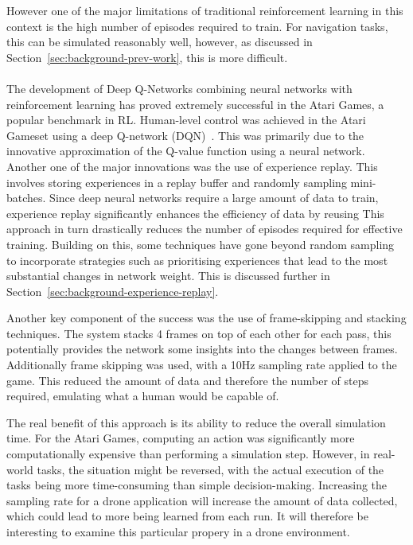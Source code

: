However one of the major limitations of traditional reinforcement learning in this context is the high number of episodes required to train.
For navigation tasks, this can be simulated reasonably well, however, as discussed in Section~\ref{sec:background-prev-work}, this is more difficult. \\\\

The development of Deep Q-Networks combining neural networks with reinforcement learning has proved extremely successful in the Atari Games, a popular benchmark in RL.
Human-level control was achieved in the Atari Gameset using a deep Q-network (DQN)~\cite{humanLevelControlDQN}.
This was primarily due to the innovative approximation of the Q-value function using a neural network.
Another one of the major innovations was the use of experience replay.
This involves storing experiences in a replay buffer and randomly sampling mini-batches.
Since deep neural networks require a large amount of data to train, experience replay significantly enhances the efficiency of data by reusing
This approach in turn drastically reduces the number of episodes required for effective training.
Building on this, some techniques have gone beyond random sampling to incorporate strategies such as prioritising experiences that lead to the most substantial changes in network weight.
This is discussed further in Section~\ref{sec:background-experience-replay}.

Another key component of the success was the use of frame-skipping and stacking techniques.
The system stacks 4 frames on top of each other for each pass, this potentially provides the network some insights into the changes between frames.
Additionally frame skipping was used, with a 10Hz sampling rate applied to the game.
This reduced the amount of data and therefore the number of steps required, emulating what a human would be capable of.

The real benefit of this approach is its ability to reduce the overall simulation time.
For the Atari Games, computing an action was significantly more computationally expensive than performing a simulation step.
However, in real-world tasks, the situation might be reversed, with the actual execution of the tasks being more time-consuming than simple decision-making.
Increasing the sampling rate for a drone application will increase the amount of data collected, which could lead to more being learned from each run.
It will therefore be interesting to examine this particular propery in a drone environment. \\\\

